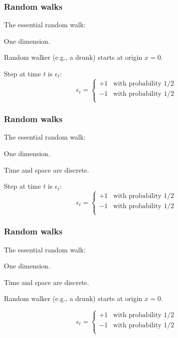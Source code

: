 \begin{frame}
  \frametitle{Random walks}

  The essential random walk:

   One dimension.


  \inv

  Random walker (e.g., a drunk) starts at origin $x=0$.

  Step at time $t$ is $\epsilon_t$:
  $$
  \epsilon_t = 
  \left\{
    \begin{array}{ll}
      +1 & \mbox{with probability 1/2} \\
      -1 & \mbox{with probability 1/2} \\
    \end{array}
  \right.
  $$

\end{frame}

\begin{frame}
  \frametitle{Random walks}

  The essential random walk:

   One dimension.

   Time and space are discrete.


  \inv

  Step at time $t$ is $\epsilon_t$:
  $$
  \epsilon_t = 
  \left\{
    \begin{array}{ll}
      +1 & \mbox{with probability 1/2} \\
      -1 & \mbox{with probability 1/2} \\
    \end{array}
  \right.
  $$


\end{frame}

\begin{frame}
  \frametitle{Random walks}

  The essential random walk:

   One dimension.

   Time and space are discrete.

  Random walker (e.g., a drunk) starts at origin $x=0$.

  $$
  \epsilon_t = 
  \left\{
    \begin{array}{ll}
      +1 & \mbox{with probability 1/2} \\
      -1 & \mbox{with probability 1/2} \\
    \end{array}
  \right.
  $$


\end{frame}

